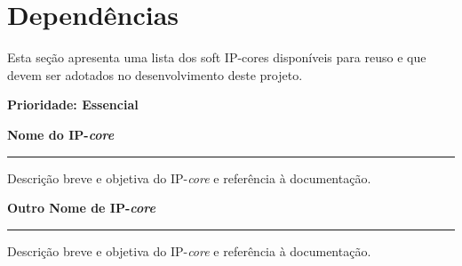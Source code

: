 \documentclass{article}
\begin{document}
\section{Dependências}
Esta seção apresenta uma lista dos soft IP-cores disponíveis para reuso e que devem ser adotados no desenvolvimento deste projeto.

\textbf{Prioridade: Essencial}

  \begin{dependencies}
    \item \textbf{Nome do IP-\textit{core}}\hrule
    Descrição breve e objetiva do IP-\textit{core} e referência à documentação.

    \item \textbf{Outro Nome de IP-\textit{core}}\hrule
    Descrição breve e objetiva do IP-\textit{core} e referência à documentação.  
\end{dependencies}  

% 
% 
\end{document}
